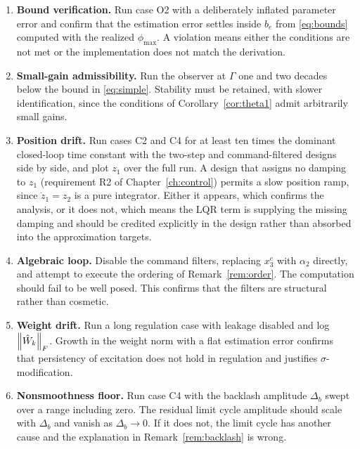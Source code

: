 \begin{enumerate}[label=T\arabic*.,leftmargin=*]

\item \textbf{Bound verification.} Run case O2 with a deliberately inflated
parameter error and confirm that the estimation error settles inside $b_e$ from
\eqref{eq:bounds} computed with the realized $\phi_{\max}$. A violation means
either the conditions are not met or the implementation does not match the
derivation.

\item \textbf{Small-gain admissibility.} Run the observer at
$\Gamma$ one and two decades below the bound in \eqref{eq:simple}. Stability
must be retained, with slower identification, since the conditions of
Corollary~\ref{cor:theta1} admit arbitrarily small gains.

\item \textbf{Position drift.} Run cases C2 and C4 for at least ten times the
dominant closed-loop time constant with the two-step and command-filtered
designs side by side, and plot $z_1$ over the full run. A design that assigns no damping to $z_1$ (requirement R2 of
Chapter~\ref{ch:control}) permits a slow position ramp, since $\dot z_1=z_2$ is
a pure integrator. Either it appears, which confirms the analysis, or it does
not, which means the LQR term is supplying the missing damping and should be
credited explicitly in the design rather than absorbed into the approximation
targets.

\item \textbf{Algebraic loop.} Disable the command filters, replacing $x_3^c$
with $\alpha_2$ directly, and attempt to execute the ordering of
Remark~\ref{rem:order}. The computation should fail to be well posed. This
confirms that the filters are structural rather than cosmetic.

\item \textbf{Weight drift.} Run a long regulation case with leakage disabled
and log $\left\lVert \hat{W}_k \right\rVert_F$. Growth in the weight norm with a flat estimation
error confirms that persistency of excitation does not hold in regulation and
justifies $\sigma$-modification.

\item \textbf{Nonsmoothness floor.} Run case C4 with the backlash amplitude
$\Delta_b$ swept over a range including zero. The residual limit cycle
amplitude should scale with $\Delta_b$ and vanish as $\Delta_b\to0$. If it does
not, the limit cycle has another cause and the explanation in Remark~\ref{rem:backlash} is wrong.

\end{enumerate}

